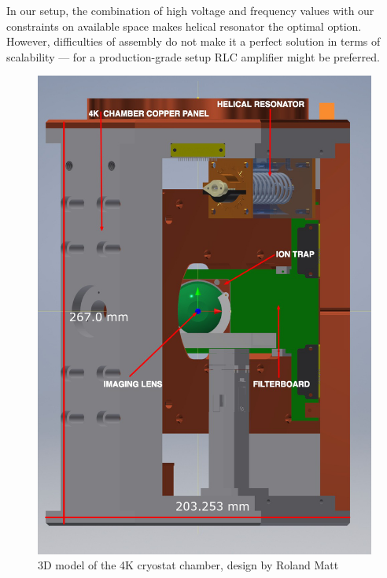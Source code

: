 In our setup, the combination of high voltage and frequency values with our constraints on available space makes helical resonator the optimal option. However, difficulties of assembly do not make it a perfect solution in terms of scalability --- for a production-grade setup RLC amplifier might be preferred.

\begin{figure}[h]
	\includegraphics[width=\textwidth]{images/4K_chamber_annotated}
	\caption{3D model of the 4K cryostat chamber, design by Roland Matt}
	\label{fig:4K_chamber}
\end{figure}